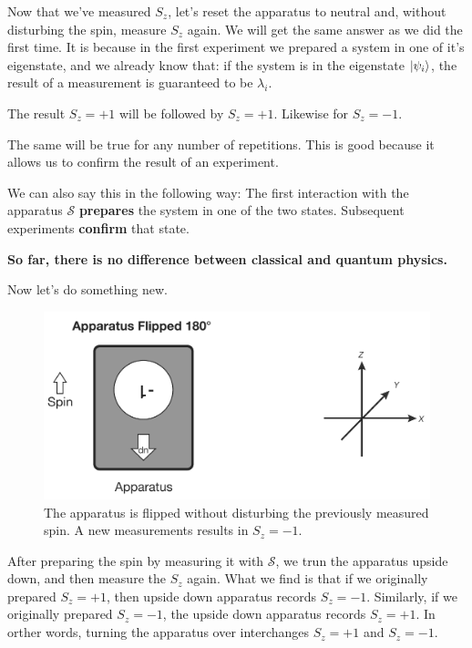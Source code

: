 \documentclass{article}
\begin{document}
Now that we've measured $S_z$, let's reset the apparatus to neutral and, without disturbing the spin, measure $S_z$ again. We will get the same answer as we did the first time. It is because in the first experiment we prepared a system in one of it's eigenstate, and we already know that: if the system is in the eigenstate $\ket{\psi_i}$, the result of a measurement is guaranteed to be $\lambda_i$.

The result $S_z = + 1$ will be followed by $S_z = + 1$. Likewise for $S_z = - 1$. 


The same will be true for any number of repetitions. This is good because it allows us to confirm the result of an experiment.


We can also say this in the following way: The first interaction with the apparatus $\mathcal{S}$ \textbf{prepares} the system in one of the two states. Subsequent experiments \textbf{confirm} that state. 

\textbf{So far, there is no difference between classical and quantum physics.}


Now let’s do something new.

\begin{figure}[H]
\centering
\includegraphics[scale=0.4]{stern_and_gerlach_2}
\caption{The apparatus is flipped without disturbing the previously measured spin. A new measurements results in $S_z = -1$.}\label{stern_and_gerlach_2_pic}
\end{figure}


After preparing the spin by measuring it with $\mathcal{S}$, we trun the apparatus upside down, and then measure the $S_z$ again. What we find is that if we originally prepared $S_z = + 1$, then upside down apparatus records $S_z = - 1$. Similarly, if we originally prepared $S_z = - 1$, the upside down apparatus records $S_z = + 1$. In orther words, turning the apparatus over interchanges $S_z = + 1$ and $S_z = - 1$.
\end{document}
